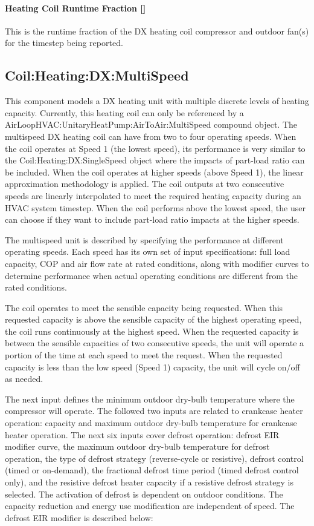 \paragraph{Heating Coil Runtime Fraction {[]}}\label{heating-coil-runtime-fraction-4}

This is the runtime fraction of the DX heating coil compressor and outdoor fan(s) for the timestep being reported.

\subsection{Coil:Heating:DX:MultiSpeed}\label{coilheatingdxmultispeed}

This component models a DX heating unit with multiple discrete levels of heating capacity. Currently, this heating coil can only be referenced by a AirLoopHVAC:UnitaryHeatPump:AirToAir:MultiSpeed compound object. The multispeed DX heating coil can have from two to four operating speeds. When the coil operates at Speed 1 (the lowest speed), its performance is very similar to the Coil:Heating:DX:SingleSpeed object where the impacts of part-load ratio can be included. When the coil operates at higher speeds (above Speed 1), the linear approximation methodology is applied. The coil outputs at two consecutive speeds are linearly interpolated to meet the required heating capacity during an HVAC system timestep. When the coil performs above the lowest speed, the user can choose if they want to include part-load ratio impacts at the higher speeds.

The multispeed unit is described by specifying the performance at different operating speeds. Each speed has its own set of input specifications: full load capacity, COP and air flow rate at rated conditions, along with modifier curves to determine performance when actual operating conditions are different from the rated conditions.

The coil operates to meet the sensible capacity being requested. When this requested capacity is above the sensible capacity of the highest operating speed, the coil runs continuously at the highest speed. When the requested capacity is between the sensible capacities of two consecutive speeds, the unit will operate a portion of the time at each speed to meet the request. When the requested capacity is less than the low speed (Speed 1) capacity, the unit will cycle on/off as needed.

The next input defines the minimum outdoor dry-bulb temperature where the compressor will operate. The followed two inputs are related to crankcase heater operation: capacity and maximum outdoor dry-bulb temperature for crankcase heater operation. The next six inputs cover defrost operation: defrost EIR modifier curve, the maximum outdoor dry-bulb temperature for defrost operation, the type of defrost strategy (reverse-cycle or resistive), defrost control (timed or on-demand), the fractional defrost time period (timed defrost control only), and the resistive defrost heater capacity if a resistive defrost strategy is selected. The activation of defrost is dependent on outdoor conditions. The capacity reduction and energy use modification are independent of speed. The defrost EIR modifier is described below:

